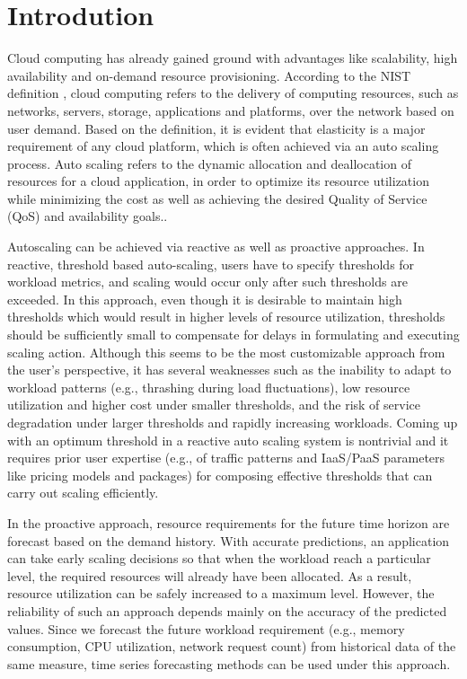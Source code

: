 \section{Introdution}

Cloud computing has already gained ground with advantages like scalability, high availability and on-demand resource provisioning. According to the NIST definition \cite{Mell_2011}, cloud computing refers to the delivery of computing resources, such as networks, servers, storage, applications and platforms, over the network based on user demand. Based on the definition, it is evident that elasticity is a major requirement of any cloud platform, which is often achieved via an auto scaling process. Auto scaling refers to the dynamic allocation and deallocation of resources for a cloud application, in order to optimize its resource utilization while minimizing the cost as well as achieving the desired Quality of Service (QoS) and availability goals.\cite{Roy_2011}\cite{Armbrust_2010}.

Autoscaling can be achieved via reactive as well as proactive approaches. In reactive, threshold based auto-scaling, users have to specify thresholds for workload metrics, and scaling would occur only after such thresholds are exceeded\cite{Lorido_Botran_2014}. In this approach, even though it is desirable to maintain high thresholds which would result in higher levels of resource utilization, thresholds should be sufficiently small to compensate for delays in formulating and executing scaling action. Although this seems to be the most customizable approach from the user’s perspective, it has several weaknesses \cite{Alipour:2014:AAI:2735522.2735532} such as the inability to adapt to workload patterns (e.g., thrashing during load fluctuations), low resource utilization and higher cost under smaller thresholds, and the risk of service degradation under larger thresholds and rapidly increasing workloads. Coming up with an optimum threshold in a reactive auto scaling system is nontrivial and it requires prior user expertise (e.g., of traffic patterns and IaaS/PaaS parameters like pricing models and packages) for composing effective thresholds that can carry out scaling efficiently.

In the proactive approach, resource requirements for the future time horizon are forecast based on the demand history. With accurate predictions, an application can take early scaling decisions so that when the workload reach a particular level, the required resources will already have been allocated. As a result, resource utilization can be safely increased to a maximum level. However, the reliability of such an approach depends mainly on the accuracy of the predicted values. Since we forecast the future workload requirement (e.g., memory consumption, CPU utilization, network request count) from historical data of the same measure, time series forecasting methods can be used under this approach.

